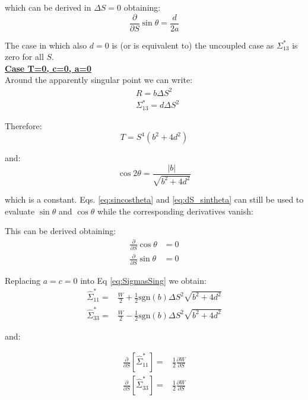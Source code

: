 which can be derived in $\Delta S = 0$ obtaining:
\begin{equation}
\frac{\partial }{\partial S} \sin \theta =\frac{d}{2a} 
\end{equation}

The case in which also $d=0$ is (or is equivalent to) the uncoupled case as $\Sigma^*_{13}$ is zero for all $S$.
~\\


\textbf{\underline{Case T=0, c=0, a=0}}
~\\

Around the apparently singular point we can write:
\begin{align}
&R = b \Delta S^2\\
&\Sigma^*_{13} =d \Delta S^2
\end{align}

Therefore:
\begin{equation}
T = S^4\left( b^2 + 4 d^2\right)
\end{equation}

and:
\begin{equation}
\cos 2 \theta = \frac{\left|b\right|}{\sqrt{b^2+4d^2}}
\end{equation}

which is a constant. Eqs. \ref{eq:sincostheta} and \ref{eq:dS_sintheta} can still be used to evaluate $\sin \theta$ and $\cos \theta$ while the corresponding derivatives vanish:

This can be derived obtaining:
\begin{align}
\frac{\partial }{\partial S} \cos \theta &= 0\\
\frac{\partial }{\partial S} \sin \theta &= 0
\end{align}

Replacing $a=c=0$ into Eq \ref{eq:SigmasSing} we obtain:
\begin{align}
\hat{\Sigma}^*_{11}  =& \frac{W}{2}
+\frac{1}{2}\mathrm{sgn}(b)\Delta S^2\sqrt{b^2+4d^2} \\
\hat{\Sigma}^*_{33} =& \frac{W}{2}
-\frac{1}{2}\mathrm{sgn}(b)\Delta S^2\sqrt{b^2+4d^2}
\end{align}

and:

\begin{align}
\frac{\partial }{\partial S} \left[\hat{\Sigma}^*_{11} \right] =& \frac{1}{2}\frac{\partial W }{\partial S}\\
\frac{\partial }{\partial S} \left[\hat{\Sigma}^*_{33} \right] =& \frac{1}{2}\frac{\partial W }{\partial S}
\end{align}

